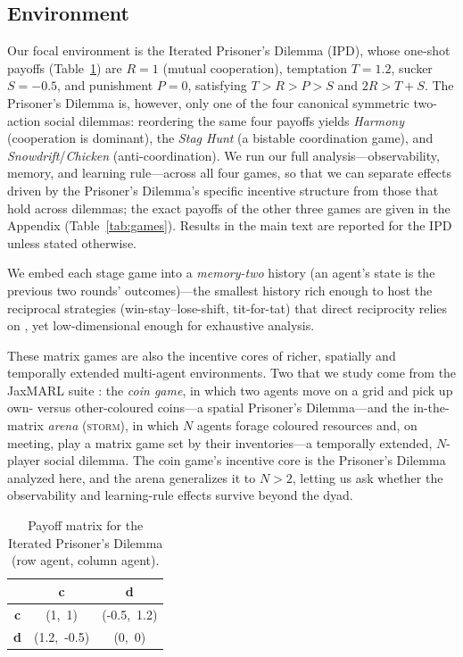 \documentclass{article}
\begin{document}
\subsection{Environment}

Our focal environment is the Iterated Prisoner's Dilemma (IPD), whose one-shot payoffs (Table~\ref{tab:payoff}) are $R=1$ (mutual cooperation), temptation $T=1.2$, sucker $S=-0.5$, and punishment $P=0$, satisfying $T>R>P>S$ and $2R>T+S$. The Prisoner's Dilemma is, however, only one of the four canonical symmetric two-action social dilemmas: reordering the same four payoffs yields \emph{Harmony} (cooperation is dominant), the \emph{Stag Hunt} (a bistable coordination game), and \emph{Snowdrift}/\emph{Chicken} (anti-coordination). We run our full analysis---observability, memory, and learning rule---across all four games, so that we can separate effects driven by the Prisoner's Dilemma's specific incentive structure from those that hold across dilemmas; the exact payoffs of the other three games are given in the Appendix (Table~\ref{tab:games}). Results in the main text are reported for the IPD unless stated otherwise.

We embed each stage game into a \emph{memory-two} history (an agent's state is the previous two rounds' outcomes)---the smallest history rich enough to host the reciprocal strategies (win-stay--lose-shift, tit-for-tat) that direct reciprocity relies on \cite{11, 16}, yet low-dimensional enough for exhaustive analysis.

These matrix games are also the incentive cores of richer, spatially and temporally extended multi-agent environments. Two that we study come from the JaxMARL suite \cite{17}: the \emph{coin game}, in which two agents move on a grid and pick up own- versus other-coloured coins---a spatial Prisoner's Dilemma---and the in-the-matrix \emph{arena} (\textsc{storm}), in which $N$ agents forage coloured resources and, on meeting, play a matrix game set by their inventories---a temporally extended, $N$-player social dilemma. The coin game's incentive core is the Prisoner's Dilemma analyzed here, and the arena generalizes it to $N>2$, letting us ask whether the observability and learning-rule effects survive beyond the dyad.

\begin{table}[htbp]
  \caption{Payoff matrix for the Iterated Prisoner's Dilemma (row agent, column agent).}
  \label{tab:payoff}
  \centering
  \begin{tabular}{@{} ccc @{}}
    \toprule
    & \textbf{c} & \textbf{d} \\
    \midrule
    \textbf{c} & (1,\ 1) & (-0.5,\ 1.2) \\
    \textbf{d} & (1.2,\ -0.5) & (0,\ 0) \\
    \bottomrule
  \end{tabular}
\end{table}
\end{document}
